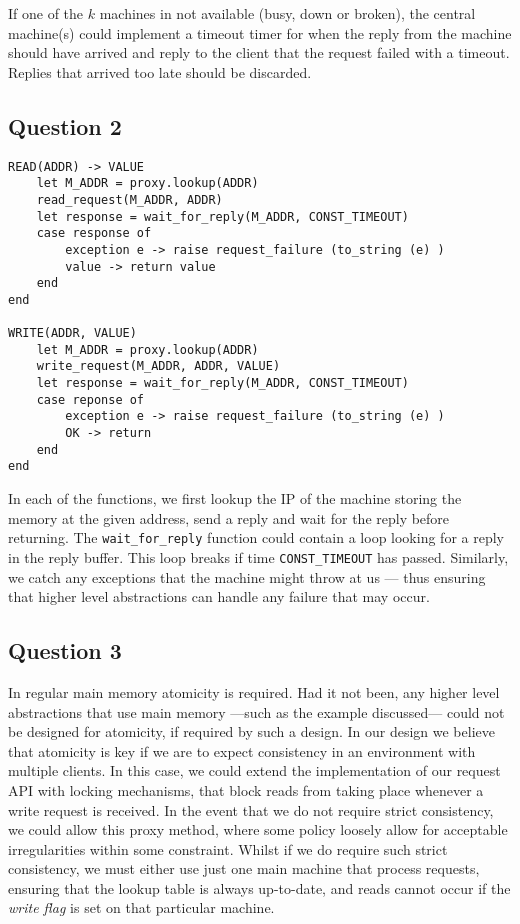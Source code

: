 \documentclass[10pt,a4paper]{article}
\begin{document}
If one of the $k$ machines in not available (busy, down or broken), the central machine(s) could implement a timeout timer for when the reply from the machine should have arrived and reply to the client that the request failed with a timeout. Replies that arrived too late should be discarded.

\subsection{Question 2}

\begin{lstlisting}
READ(ADDR) -> VALUE
    let M_ADDR = proxy.lookup(ADDR)
    read_request(M_ADDR, ADDR)
    let response = wait_for_reply(M_ADDR, CONST_TIMEOUT)
    case response of
        exception e -> raise request_failure (to_string (e) )
        value -> return value
    end
end

WRITE(ADDR, VALUE)
    let M_ADDR = proxy.lookup(ADDR)
    write_request(M_ADDR, ADDR, VALUE)
    let response = wait_for_reply(M_ADDR, CONST_TIMEOUT)
    case reponse of
        exception e -> raise request_failure (to_string (e) )
        OK -> return
    end
end
\end{lstlisting}

In each of the functions, we first lookup the IP of the machine storing the memory at the given address, send a reply and wait for the reply before returning. The {\tt wait\_for\_reply} function could contain a loop looking for a reply in the reply buffer. This loop breaks if time {\tt CONST\_TIMEOUT} has passed. Similarly, we catch any exceptions that the machine might throw at us --- thus ensuring that higher level abstractions can handle any failure that may occur.

\subsection{Question 3}

In regular main memory atomicity is required. Had it not been, any higher level abstractions that use main memory ---such as the example discussed--- could not be designed for atomicity, if required by such a design. In our design we believe that atomicity is key if we are to expect consistency in an environment with multiple clients. In this case, we could extend the implementation of our request API with locking mechanisms, that block reads from taking place whenever a write request is received. In the event that we do not require strict consistency, we could allow this proxy method, where some policy loosely allow for acceptable irregularities within some constraint. Whilst if we do require such strict consistency, we must either use just one main machine that process requests, ensuring that the lookup table is always up-to-date, and reads cannot occur if the {\it write flag} is set on that particular machine.
\end{document}
